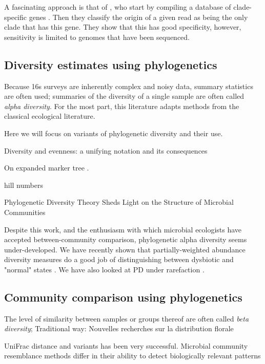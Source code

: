 \documentclass{amsart}
\begin{document}
A fascinating approach is that of \citet{segata2012metagenomic}, who start by compiling a database of clade-specific genes \citep{segata2011metagenomic}.
Then they classify the origin of a given read as being the only clade that has this gene.
They show that this has good specificity, however, sensitivity is limited to genomes that have been sequenced.


\subsection{Diversity estimates using phylogenetics}
Because 16s surveys are inherently complex and noisy data, summary statistics are often used; summaries of the diversity of a single sample are often called \emph{alpha diversity}.
For the most part, this literature adapts methods from the classical ecological literature.

Here we will focus on variants of phylogenetic diversity and their use.

\cite{hill1973diversity}
Diversity and evenness: a unifying notation and its consequences

On expanded marker tree \cite{kembel2011phylogenetic}.

hill numbers
\cite{chao2010phylogenetic}

\cite{odwyer2012phylogenetic}
Phylogenetic Diversity Theory Sheds Light on the Structure of Microbial Communities

Despite this work, and the enthusiasm with which microbial ecologists have accepted between-community comparison, phylogenetic alpha diversity seems under-developed.
We have recently shown that partially-weighted abundance diversity measures do a good job of distinguishing between dysbiotic and "normal" states \cite{mccoy2013abundance}.
We have also looked at PD under rarefaction \cite{nipperess2013mean}.


\subsection{Community comparison using phylogenetics}

The level of similarity between samples or groups thereof are often called \emph{beta diversity};
Traditional way: \cite{jaccard1908nouvelles} Nouvelles recherches sur la distribution florale

UniFrac distance and variants has been very successful.
\cite{LozuponeKnightUniFrac05}
\cite{LozuponeEaWeightedUnifrac07}
\cite{kuczynski2010microbial} Microbial community resemblance methods differ in their ability to detect biologically relevant patterns
\end{document}
